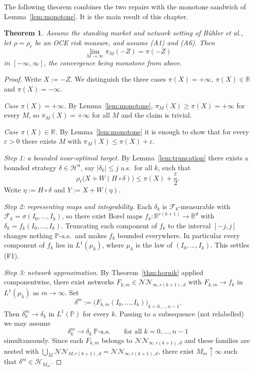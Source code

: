 \documentclass[11pt,a4paper]{report}
\numberwithin{equation}{chapter}
\theoremstyle{plain}
\newtheorem{theorem}[proposition]{Theorem}
\theoremstyle{definition}
\newcommand{\PP}{\mathbb{P}}
\newcommand{\R}{\mathbb{R}}
\newcommand{\F}{\mathcal{F}}
\newcommand{\HH}{\mathcal{H}}
\newcommand{\Hu}{\mathcal{H}^{\mathrm{u}}}
\newcommand{\NNet}{\mathcal{N\!N}}
\newcommand{\as}{\ \PP\text{-a.s.}}
\begin{document}
The following theorem combines the two repairs with the monotone
sandwich of Lemma~\ref{lem:monotone}. It is the main result of this
chapter.

\begin{theorem}\label{thm:approximation}
  Assume the standing market and network setting of B\"uhler et al., let
  $\rho=\rho_\ell$ be an OCE risk measure, and assume (A1) and (A6). Then
  \[
    \lim_{M\to\infty}\pi_M(-Z)=\pi(-Z)
  \]
  in $[-\infty,\infty]$, the convergence being monotone from above.
\end{theorem}

\begin{proof}
  Write $X:=-Z$. We distinguish the three cases
  $\pi(X)=+\infty$, $\pi(X)\in\R$ and $\pi(X)=-\infty$.

  \textit{Case $\pi(X)=+\infty$.}
  By Lemma~\ref{lem:monotone}, $\pi_M(X)\ge\pi(X)=+\infty$ for every
  $M$, so $\pi_M(X)=+\infty$ for all $M$ and the claim is trivial.

  \textit{Case $\pi(X)\in\R$.}
  By Lemma~\ref{lem:monotone} it is enough to show that for every
  $\varepsilon>0$ there exists $M$ with
  $\pi_M(X)\le\pi(X)+\varepsilon$.

  \textit{Step 1: a bounded near-optimal target.}
  By Lemma~\ref{lem:truncation} there exists a bounded strategy
  $\delta\in\Hu$, say $|\delta_k|\le j$ a.s.\ for all $k$, such that
  \[
    \rho_\ell\bigl(X+W(H\circ\delta)\bigr)\le\pi(X)+\frac{\varepsilon}{2}.
  \]
  Write $\eta:=H\circ\delta$ and $Y:=X+W(\eta)$.

  \textit{Step 2: representing maps and integrability.}
  Each $\delta_k$ is $\F_k$-measurable with
  $\F_k=\sigma(I_0,\dots,I_k)$, so there exist Borel maps
  $f_k:\R^{r(k+1)}\to\R^d$ with $\delta_k=f_k(I_0,\dots,I_k)$.
  Truncating each component of $f_k$ to the interval $[-j,j]$ changes
  nothing $\PP$-a.s.\ and makes $f_k$ bounded everywhere. In particular
  every component of $f_k$ lies in $L^1(\mu_k)$, where $\mu_k$ is the
  law of $(I_0,\dots,I_k)$. This settles (F1).

  \textit{Step 3: network approximation.}
  By Theorem~\ref{thm:hornik} applied componentwise, there exist
  networks $F_{k,m}\in\NNet_{\infty,r(k+1),d}$ with $F_{k,m}\to f_k$
  in $L^1(\mu_k)$ as $m\to\infty$. Set
  \[
    \delta^m:=\bigl(F_{k,m}(I_0,\dots,I_k)\bigr)_{k=0,\dots,n-1}.
  \]
  Then $\delta^m_k\to\delta_k$ in $L^1(\PP)$ for every $k$. Passing to a
  subsequence (not relabelled) we may assume
  \[
    \delta^m_k\longrightarrow\delta_k\as\qquad\text{for all }k=0,\dots,n-1
  \]
  simultaneously. Since each $F_{k,m}$ belongs to
  $\NNet_{\infty,r(k+1),d}$ and these families are nested with
  $\bigcup_M\NNet_{M,r(k+1),d}=\NNet_{\infty,r(k+1),d}$, there exist
  $M_m\uparrow\infty$ such that $\delta^m\in\HH_{M_m}$.


\end{proof}
\end{document}
